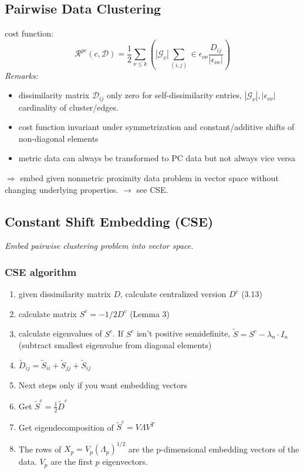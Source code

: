 \documentclass[9pt,parskip]{scrartcl}
\begin{document}
\begin{multicols*}{4}
\subsection*{Pairwise Data Clustering}
cost function: 
\[\mathcal{R}^{pc}(c, \mathcal{D}) = \frac 1 2 \sum_{\nu \leq k} \left( |\mathcal{G}_{\nu}| \sum_{(i,j)} \in \epsilon_{\nu \nu} \frac{D_{ij}}{|\epsilon_{\nu \nu}|} \right) \]
\textit{Remarks:} 
\begin{itemize}
	\item dissimilarity matrix $\mathcal{D}_{ij}$ only zero for self-dissimilarity entries, $|\mathcal{G}_{\nu}|, |\epsilon_{\nu \nu}|$ cardinality of cluster/edges. 
	\item cost function invariant under symmetrization and constant/additive shifts of non-diagonal elements
	\item metric data can always be transformed to PC data but not always vice versa
\end{itemize}
$ \Rightarrow $ embed given nonmetric proximity data problem in vector space without changing underlying properties. $\rightarrow$ see CSE.
\subsection*{Constant Shift Embedding (CSE)}
\textit{Embed pairwise clustering problem into vector space.}
\subsubsection*{CSE algorithm}
\begin{enumerate}
	\item given dissimilarity matrix $D$, calculate centralized version $D^c$ (3.13)
	\item calculate matrix $S^c = - 1/2 D^c$ (Lemma 3)
	\item calculate eigenvalues of $S^c$. If $S^c$ isn't positive semidefinite, $\tilde{S} = S^c - \lambda_n \cdot I_n$ (subtract smallest eigenvalue from diagonal elements)
	\item  $\tilde{D}_{ij} =  \tilde{S}_{ii} +   \tilde{S}_{jj} + \tilde{S}_{ij} $
	\item Next steps only if you want embedding vectors
	\item Get $\tilde{S}^c = \frac{1}{2}\tilde{D}^c$
	\item Get eigendecomposition of $\tilde{S}^c = V\Lambda V^T$
	\item The rows of $X_p = V_p (\Lambda_p)^{1/2}$ are the p-dimensional embedding vectors of the data. $V_p$ are the first $p$ eigenvectors.
\end{enumerate}


\end{multicols*}
\end{document}
